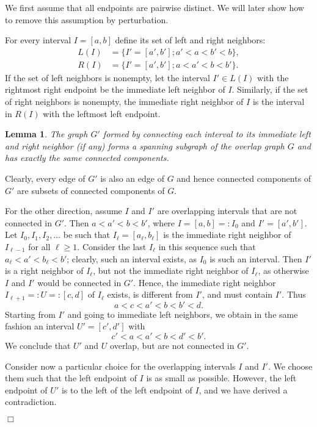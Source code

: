 \documentclass[paper=a4]{scrartcl}
\newtheorem{lemma}{Lemma}
\newcommand{\qed}{}
\newcommand{\mqed}{\hfill$\Box$}
\newlength{\proofpostskipamount}\newlength{\proofpreskipamount}
\newenvironment{proof}{\par\vspace{\proofpreskipamount}\noindent{\textbf{Proof:}}\hspace{0.5em}}{\nopagebreak \strut\nopagebreak \hspace{\fill}\mqed\par\vspace{\proofpostskipamount}\noindent}
\begin{document}
We first assume that all endpoints are pairwise distinct. We will later show how to remove this assumption by perturbation.

For every interval $I = [a,b]$ define its set of left and right neighbors:
\begin{align*}
L(I) &= \{ I' = [a',b'] ; a' < a < b' < b \},\\
R(I) &= \{ I' = [a',b'] ; a < a' < b < b' \}.
\end{align*}
If the set of left neighbors is nonempty, let the interval $I' \in L(I)$ with the rightmost right endpoint be the immediate left neighbor of $I$. Similarly, if the set of right neighbors is nonempty, the immediate right neighbor of $I$ is the interval in $R(I)$ with the leftmost left endpoint.

\begin{lemma} The graph $G'$ formed by connecting each interval to its immediate left and right neighbor (if any) forms a spanning subgraph of the overlap graph $G$ and has exactly the same connected components.
\end{lemma}
\begin{proof} Clearly, every edge of $G'$ is also an edge of $G$ and hence
  connected components of $G'$ are subsets of connected components of $G$.

For the other direction, assume $I$ and $I'$ are overlapping intervals that are not connected in $G'$. Then $a < a' < b < b'$, where $I = [a,b] =: I_0$ and $I'=[a',b']$. Let $I_0,I_1,I_2,\ldots$ be such that $I_\ell = [a_\ell,b_\ell]$ is the immediate right neighbor of $I_{\ell - 1}$ for all $\ell \geq 1$. Consider the last $I_\ell$ in this sequence such that $a_\ell < a' < b_\ell < b'$; clearly, such an interval exists, as $I_0$ is such an interval. Then $I'$ is a right neighbor of $I_\ell$, but not the immediate right neighbor of $I_\ell$, as otherwise $I$ and $I'$ would be connected in $G'$. Hence, the immediate right neighbor $I_{\ell +1} =: U =: [c,d]$ of $I_\ell$ exists, is different from $I'$, and must contain $I'$. Thus
\[
	a < c < a' < b < b' < d.
\]
Starting from $I'$ and going to immediate left neighbors, we obtain in the same fashion an interval $U' = [c',d']$ with
\[
	c' < a < a' < b < d' < b'.
\]
We conclude that $U'$ and $U$ overlap, but are not connected in $G'$. 

Consider now a particular choice for the overlapping intervals $I$ and $I'$. We choose them such that the left endpoint of $I$ is as small as possible. However, the left endpoint of $U'$ is to the left of the left endpoint of $I$, and we have derived a contradiction. \qed
\end{proof}
\end{document}
